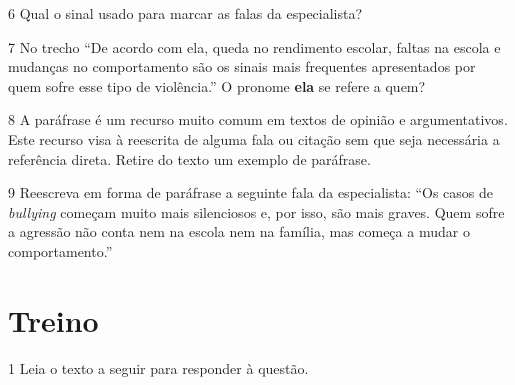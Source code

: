 
\num{6} Qual o sinal usado para marcar as falas da especialista? 


\num{7} No trecho ``De acordo com ela, queda no rendimento escolar, faltas na
escola e mudanças no comportamento são os sinais mais frequentes
apresentados por quem sofre esse tipo de violência.'' O pronome \textbf{ela} se
refere a quem?


\num{8} A paráfrase é um recurso muito comum em textos de opinião e
argumentativos. Este recurso visa à reescrita de alguma fala ou
citação sem que seja necessária a referência direta. Retire do texto
um exemplo de paráfrase.


\num{9} Reescreva em forma de paráfrase a seguinte fala da especialista: ``Os 
casos de \textit{bullying} começam muito mais silenciosos e, por isso, são mais graves. 
Quem sofre a agressão não conta nem na escola nem na família, mas começa a mudar 
o comportamento.''


\section*{Treino}

\num{1} Leia o texto a seguir para responder à questão.


